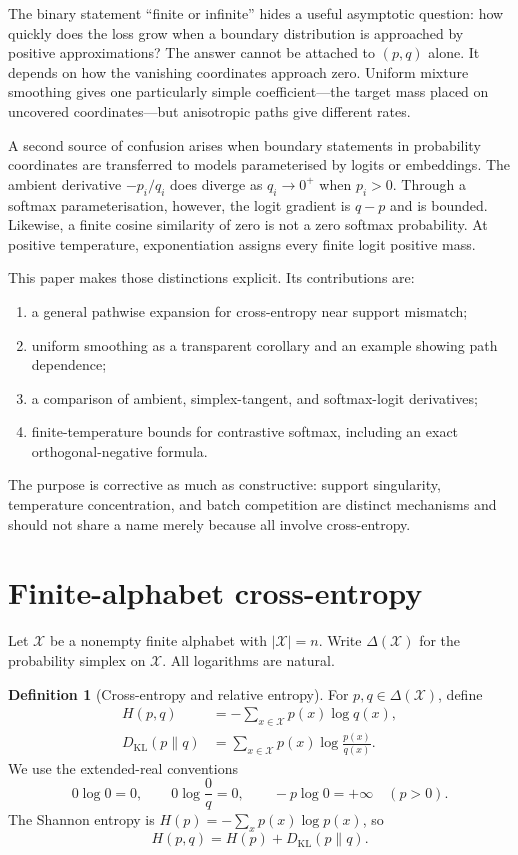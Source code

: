 \documentclass[11pt,a4paper]{article}
\theoremstyle{definition}
\newtheorem{definition}[theorem]{Definition}
\theoremstyle{remark}
\newcommand{\KL}{D_{\mathrm{KL}}}
\newcommand{\simplex}{\Delta(\mathcal X)}
\begin{document}
The binary statement ``finite or infinite'' hides a useful asymptotic question: how quickly does the loss grow when a boundary distribution is approached by positive approximations?
The answer cannot be attached to $(p,q)$ alone.
It depends on how the vanishing coordinates approach zero.
Uniform mixture smoothing gives one particularly simple coefficient---the target mass placed on uncovered coordinates---but anisotropic paths give different rates.

A second source of confusion arises when boundary statements in probability coordinates are transferred to models parameterised by logits or embeddings.
The ambient derivative $-p_i/q_i$ does diverge as $q_i\to0^+$ when $p_i>0$.
Through a softmax parameterisation, however, the logit gradient is $q-p$ and is bounded.
Likewise, a finite cosine similarity of zero is not a zero softmax probability.
At positive temperature, exponentiation assigns every finite logit positive mass.

This paper makes those distinctions explicit.
Its contributions are:
\begin{enumerate}[label=(\roman*)]
  \item a general pathwise expansion for cross-entropy near support mismatch;
  \item uniform smoothing as a transparent corollary and an example showing path dependence;
  \item a comparison of ambient, simplex-tangent, and softmax-logit derivatives;
  \item finite-temperature bounds for contrastive softmax, including an exact orthogonal-negative formula.
\end{enumerate}

The purpose is corrective as much as constructive: support singularity, temperature concentration, and batch competition are distinct mechanisms and should not share a name merely because all involve cross-entropy.

\section{Finite-alphabet cross-entropy}
\label{sec:setup}

Let $\mathcal X$ be a nonempty finite alphabet with $|\mathcal X|=n$.
Write $\simplex$ for the probability simplex on $\mathcal X$.
All logarithms are natural.

\begin{definition}[Cross-entropy and relative entropy]
For $p,q\in\simplex$, define
\begin{align}
  H(p,q) &= -\sum_{x\in\mathcal X}p(x)\log q(x), \\
  \KL(p\|q) &= \sum_{x\in\mathcal X}p(x)\log\frac{p(x)}{q(x)}.
\end{align}
We use the extended-real conventions
\[
  0\log 0=0,
  \qquad
  0\log\frac{0}{q}=0,
  \qquad
  -p\log0=+\infty\quad(p>0).
\]
The Shannon entropy is $H(p)=-\sum_xp(x)\log p(x)$, so
\begin{equation}
  H(p,q)=H(p)+\KL(p\|q).
  \label{eq:ce-kl}
\end{equation}
\end{definition}
\end{document}
